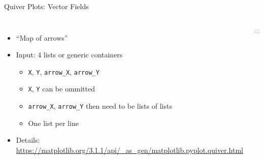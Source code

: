 \begin{frame}[fragile]{Quiver Plots: Vector Fields}
%
\vspace{-15pt}
\begin{columns}[t]
\begin{itemize}
\item \enquote{Map of arrows}
\item Input: 4 lists or generic containers
	\begin{itemize}
	\item \texttt{X}, \texttt{Y}, \texttt{arrow\_X}, \texttt{arrow\_Y}
	\item \texttt{X}, \texttt{Y} can be ommitted
	\item \texttt{arrow\_X}, \texttt{arrow\_Y} then need to be lists of lists
	\item One list per line
	\end{itemize}

\item Details:\\
{\scriptsize\url{https://matplotlib.org/3.1.1/api/_as_gen/matplotlib.pyplot.quiver.html}}
\end{itemize}
%
\vspace{-10pt}
\begin{tcolorbox}[title=Quiver Plot]
	\includegraphics[width=\linewidth]{./gfx/plt-vortex}
\end{tcolorbox}
\end{columns}
%
\end{frame}



